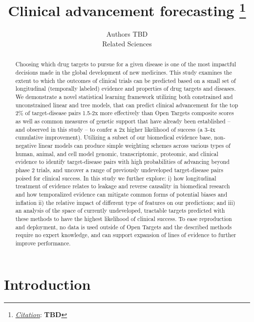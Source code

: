 \documentclass{article}
\title{Clinical advancement forecasting
\thanks{\textit{\underline{Citation}}: 
\textbf{TBD}} 
}
\author{
  Authors TBD \\
  Related Sciences \\
}
\begin{document}
\maketitle

\def\evaluationDatasetPairCount{9010}
\def\topRankingPct{2}
\def\bottomRankingPct{98}

\begin{abstract}
Choosing which drug targets to pursue for a given disease is one of the most impactful decisions made in the global development of new medicines. This study examines the extent to which the outcomes of clinical trials can be predicted based on a small set of longitudinal (temporally labeled) evidence and properties of drug targets and diseases. We demonstrate a novel statistical learning framework utilizing both constrained and unconstrained linear and tree models, that can predict clinical advancement for the top \topRankingPct\% of target-disease pairs 1.5-2x more effectively than Open Targets composite scores as well as common measures of genetic support that have already been established -- and observed in this study -- to confer a 2x higher likelihood of success (a 3-4x cumulative improvement). Utilizing a subset of our biomedical evidence base, non-negative linear models can produce simple weighting schemes across various types of human, animal, and cell model genomic, transcriptomic, proteomic, and clinical evidence to identify target-disease pairs with high probabilities of advancing beyond phase 2 trials, and uncover a range of previously undeveloped target-disease pairs poised for clinical success. In this study we further explore: i) how longitudinal treatment of evidence relates to leakage and reverse causality in biomedical research and how temporalized evidence can mitigate common forms of potential biases and inflation ii) the relative impact of different type of features on our predictions; and iii) an analysis of the space of currently undeveloped, tractable targets predicted with these methods to have the highest likelihood of clinical success. To ease reproduction and deployment, no data is used outside of Open Targets and the described methods require no expert knowledge, and can support expansion of lines of evidence to further improve performance.
\end{abstract}

\section{Introduction}
\end{document}
